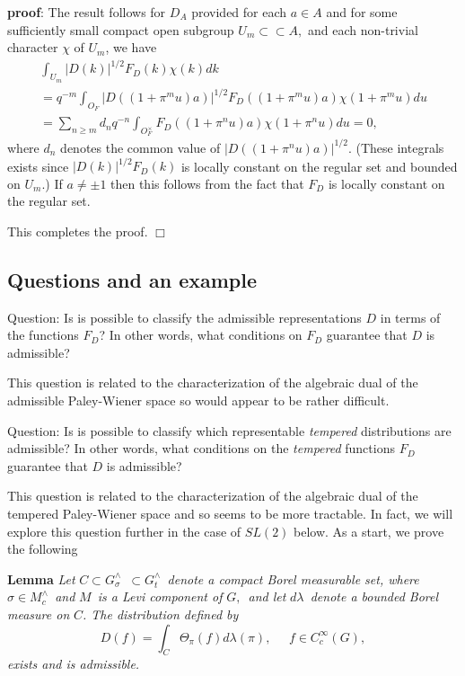 {\bf proof}: The result follows for $D_A$ provided for each $a\in A$ and for
some sufficiently small compact open subgroup $U_m\subset \subset A,$ and
each non-trivial character $\chi $ of $U_m$, we have 
\[
\begin{array}{c}
\int_{U_m}|D(k)|^{1/2}F_D(k)\chi (k)dk \\ 
=q^{-m}\int_{O_F}|D((1+\pi ^mu)a)|^{1/2}F_D((1+\pi ^mu)a)\chi (1+\pi ^mu)du
\\ 
=\sum_{n\geq m}d_nq^{-n}\int_{O_F^{\times }}F_D((1+\pi ^nu)a)\chi (1+\pi
^nu)du=0,
\end{array}
\]
where $d_n$ denotes the common value of $|D((1+\pi ^nu)a)|^{1/2}.$ (These
integrals exists since $|D(k)|^{1/2}F_D(k)$ is locally constant on the
regular set and bounded on $U_m$.) If $a\neq \pm 1$ then this follows from
the fact that $F_D$ is locally constant on the regular set.

This completes the proof. $\Box $

\subsection{Questions and an example}

{\sc Question}: Is is possible to classify the admissible representations $D$
in terms of the functions $F_D$? In other words, what conditions on $F_D$
guarantee that $D$ is admissible?

This question is related to the characterization of the algebraic dual of
the admissible Paley-Wiener space so would appear to be rather difficult.

{\sc Question}: Is is possible to classify which representable {\em tempered}
distributions are admissible? In other words, what conditions on the {\em %
tempered} functions $F_D$ guarantee that $D$ is admissible?

This question is related to the characterization of the algebraic dual of
the tempered Paley-Wiener space and so seems to be more tractable. In fact,
we will explore this question further in the case of $SL(2)$ below. As a
start, we prove the following

{\bf Lemma} {\em Let }$C\subset G_\sigma ^{\wedge }${\em \ }$\subset
G_t^{\wedge }${\em \ denote a compact Borel measurable set, where }$\sigma
\in M_c^{\wedge }${\em \ and }$M${\em \ is a Levi component of }$G,${\em \
and let }$d\lambda ${\em \ denote a bounded Borel measure on }$C${\em . The
distribution defined by} 
\[
D(f)=\int_C\Theta _\pi (f)d\lambda (\pi ),\;\;\;\;\;f\in C_c^\infty (G), 
\]
{\em exists and is admissible.}

